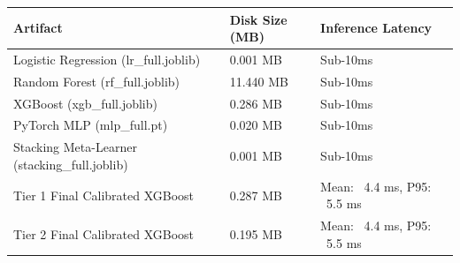 \begin{tabular}{lll}
\toprule
Artifact & Disk Size (MB) & Inference Latency \\
\midrule
Logistic Regression (lr_full.joblib) & 0.001 MB & Sub-10ms \\
Random Forest (rf_full.joblib) & 11.440 MB & Sub-10ms \\
XGBoost (xgb_full.joblib) & 0.286 MB & Sub-10ms \\
PyTorch MLP (mlp_full.pt) & 0.020 MB & Sub-10ms \\
Stacking Meta-Learner (stacking_full.joblib) & 0.001 MB & Sub-10ms \\
Tier 1 Final Calibrated XGBoost & 0.287 MB & Mean: ~4.4 ms, P95: ~5.5 ms \\
Tier 2 Final Calibrated XGBoost & 0.195 MB & Mean: ~4.4 ms, P95: ~5.5 ms \\
\bottomrule
\end{tabular}
